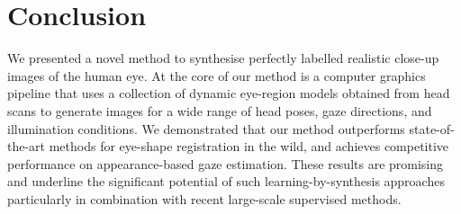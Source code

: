 
\section{Conclusion}


We presented a novel method to synthesise perfectly labelled realistic close-up images of the human eye.
At the core of our method is a computer graphics pipeline that uses a collection of dynamic eye-region models obtained from head scans to generate images for a wide range of head poses, gaze directions, and illumination conditions.
We demonstrated that our method outperforms state-of-the-art methods for eye-shape registration in the wild, and achieves competitive performance on appearance-based gaze estimation.
These results are promising and underline the significant potential of such learning-by-synthesis approaches particularly in combination with recent large-scale supervised methods.